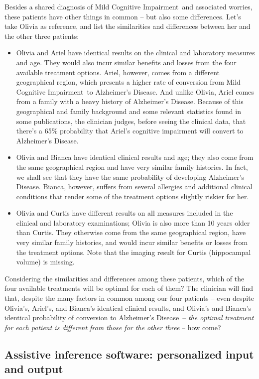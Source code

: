 \documentclass[a4paper,12pt,%
onecolumn,oneside,article,%
british%
]{memoir}
\theoremstyle{remark}
\theoremstyle{innote}
\renewcommand*{\|}[1][]{\nonscript\:#1\vert\nonscript\:\mathopen{}}
\newcommand*{\ad}{Alzheimer's Disease}
\newcommand*{\mci}{Mild Cognitive Impairment}
\begin{document}
Besides a shared diagnosis of \mci\ and associated worries, these patients have other things in common -- but also some differences. Let's take Olivia as reference, and list the similarities and differences between her and the other three patients:
\begin{itemize}
\item Olivia and Ariel have identical results on the clinical and laboratory measures and age. They would also incur similar benefits and losses from the four available treatment options. Ariel, however, comes from a different geographical region, which presents a higher rate of conversion from \mci\ to \ad. And unlike Olivia, Ariel comes from a family with a heavy history of \ad. Because of this geographical and family background and some relevant statistics found in some publications, the clinician judges, before seeing the clinical data, that there's a 65\% probability that Ariel's cognitive impairment will convert to \ad.

\item Olivia and Bianca have identical clinical results and age; they also come from the same geographical region and have very similar family histories. In fact, we shall see that they have the same probability of developing \ad. Bianca, however, suffers from several allergies and additional clinical conditions that render some of the treatment options slightly riskier for her.

\item Olivia and Curtis have different results on all measures included in the clinical and laboratory examinations; Olivia is also more than 10 years older than Curtis. They otherwise come from the same geographical region, have very similar family histories, and would incur similar benefits or losses from the treatment options. Note that the imaging result for Curtis (hippocampal volume) is missing.
\end{itemize}

Considering the similarities and differences among these patients, which of the four available treatments will be optimal for each of them? The clinician will find that, despite the many factors in common among our four patients -- even despite Olivia's, Ariel's, and Bianca's identical clinical results, and Olivia's and Bianca's identical probability of conversion to \ad\ -- \emph{the optimal treatment for each patient is different from those for the other three} -- how come?

\subsection{Assistive inference software: personalized input and output}
\label{sec:intro_purposes}
\end{document}

